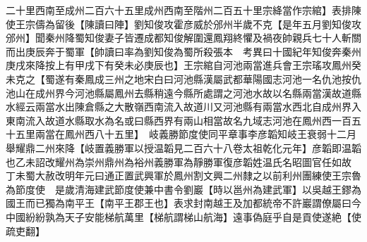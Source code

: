 二十里西南至成州二百六十五里成州西南至階州二百五十里宗絳當作宗綰】表排陳使王宗儔為留後【陳讀曰陣】劉知俊攻霍彦威於邠州半歲不克【是年五月劉知俊攻邠州】聞秦州降蜀知俊妻子皆遷成都知俊解圍還鳳翔終懼及禍夜帥親兵七十人斬關而出庚辰奔于蜀軍【帥讀曰率為劉知俊為蜀所殺張本　考異曰十國紀年知俊奔秦州庚戌來降按上有甲戌下有癸未必庚辰也】王宗綰自河池兩當進兵會王宗瑤攻鳳州癸未克之【蜀遂有秦鳳成三州之地宋白曰河池縣漢屬武都華陽國志河池一名仇池按仇池山在成州界今河池縣屬鳳州去縣稍遠今縣所處謂之河池水故以名縣兩當漢故道縣水經云兩當水出陳倉縣之大散嶺西南流入故道川又河池縣有兩當水西北自成州界入東南流入故道水縣取水為名或曰縣西界有兩山相當故名九域志河池在鳳州西一百五十五里兩當在鳳州西八十五里】　岐義勝節度使同平章事李彦韜知岐王衰弱十二月舉耀鼎二州來降【岐置義勝軍以授温韜見二百六十八卷太祖乾化元年】彦韜即温韜也乙未詔改耀州為崇州鼎州為裕州義勝軍為靜勝軍復彦韜姓温氏名昭圖官任如故　丁未蜀大赦改明年元曰通正置武興軍於鳳州割文興二州隸之以前利州團練使王宗魯為節度使　是歲清海建武節度使兼中書令劉巖【時以邕州為建武軍】以吳越王鏐為國王而已獨為南平王【南平王郡王也】表求封南越王及加都統帝不許巖謂僚屬曰今中國紛紛孰為天子安能梯航萬里【梯航謂梯山航海】遠事偽庭乎自是貢使遂絶【使疏吏翻】

